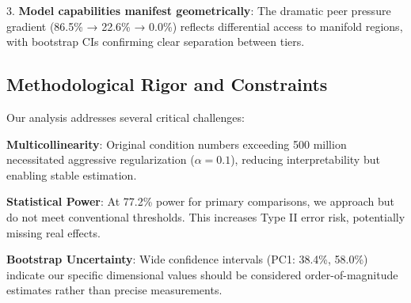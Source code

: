 \documentclass[11pt,letterpaper]{article}
\newcommand{\powerOutcomeGroups}{77.2\%}
\newcommand{\regularizationAlpha}{0.1}
\newcommand{\nonInterventionPCOneCILower}{38.4\%}
\newcommand{\nonInterventionPCOneCIUpper}{58.0\%}
\newcommand{\fullReasoningPeerPressure}{86.5\%}
\newcommand{\lightReasoningPeerPressure}{22.6\%}
\newcommand{\nonReasoningPeerPressure}{0.0\%}
\begin{document}
3. \textbf{Model capabilities manifest geometrically}: The dramatic peer pressure gradient (\fullReasoningPeerPressure{} → \lightReasoningPeerPressure{} → \nonReasoningPeerPressure{}) reflects differential access to manifold regions, with bootstrap CIs confirming clear separation between tiers.

\subsection{Methodological Rigor and Constraints}

Our analysis addresses several critical challenges:

\textbf{Multicollinearity}: Original condition numbers exceeding 500 million necessitated aggressive regularization ($\alpha = \regularizationAlpha{}$), reducing interpretability but enabling stable estimation.

\textbf{Statistical Power}: At \powerOutcomeGroups{} power for primary comparisons, we approach but do not meet conventional thresholds. This increases Type II error risk, potentially missing real effects.

\textbf{Bootstrap Uncertainty}: Wide confidence intervals (PC1: \nonInterventionPCOneCILower{}, \nonInterventionPCOneCIUpper{}) indicate our specific dimensional values should be considered order-of-magnitude estimates rather than precise measurements.
\end{document}
